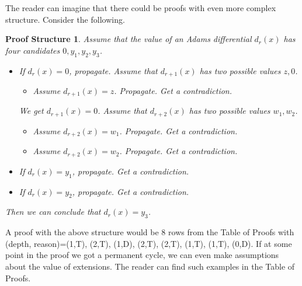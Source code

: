 \documentclass{amsart}
\numberwithin{equation}{section}
\newtheorem{proofstr}[theorem]{Proof Structure}
\begin{document}
The reader can imagine that there could be proofs with even more complex structure. Consider the following.

\begin{proofstr}\label{ps:833b7e80}
Assume that the value of an Adams differential $d_r(x)$ has four candidates $0, y_1,y_2,y_3$.
\begin{itemize}
    \item If $d_r(x)=0$, propagate. Assume that $d_{r+1}(x)$ has two possible values $z,0$.
    \begin{itemize}
        \item Assume $d_{r+1}(x)=z$. Propagate. Get a contradiction.
    \end{itemize}
    We get $d_{r+1}(x)=0$. Assume that $d_{r+2}(x)$ has two possible values $w_1,w_2$.
    \begin{itemize}
        \item Assume $d_{r+2}(x)=w_1$. Propagate. Get a contradiction.
        \item Assume $d_{r+2}(x)=w_2$. Propagate. Get a contradiction.
    \end{itemize}
    \item If $d_r(x)=y_1$, propagate. Get a contradiction.
    \item If $d_r(x)=y_2$, propagate. Get a contradiction.
\end{itemize}
Then we can conclude that $d_r(x)=y_3$.
\end{proofstr}

A proof with the above structure would be 8 rows from the Table of Proofs with (depth, reason)=(1,T), (2,T), (1,D), (2,T), (2,T), (1,T), (1,T), (0,D). If at some point in the proof we got a permanent cycle, we can even make assumptions about the value of extensions. The reader can find such examples in the Table of Proofs.
\end{document}
